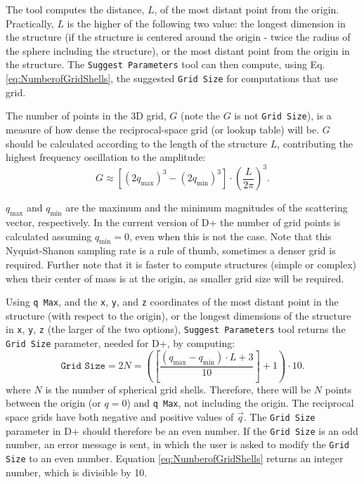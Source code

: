 \documentclass[../D+Manual.tex]{subfiles}
\begin{document}
The tool computes the distance, $L$, of the most distant point from the origin. 
\noindent Practically, $L$ is the higher of the following two value: the longest dimension in the structure (if the structure is centered around the origin - twice the radius of the sphere including the structure), or the most distant point from the origin in the structure. 
The \texttt{Suggest Parameters} tool can then compute, using Eq. \ref{eq:NumberofGridShells}, the suggested \texttt{Grid Size} for computations that use grid. 

The number of points in the 3D grid, $G$ (note the $G$ is not \texttt{Grid Size}), is a measure of how dense the reciprocal-space grid (or lookup table) will be. 
$G$ should be calculated according to the length of the structure $L$, contributing the highest frequency oscillation to the amplitude:
\begin{equation*}
G\approx \left[\left(2q_{\text{max}}\right)^3-\left(2q_{\text{min}}\right)^3\right]\cdot \left(\frac{L}{2\pi}\right)^3.
\label{eqn:GridDensity}
\end{equation*}

$q_\text{max}$ and $q_\text{min}$ are the maximum and the minimum magnitudes of the scattering vector, respectively. In the current version of D+ the number of grid points is calculated assuming  $q_\text{min}=0$, even when this is not the case. 
Note that this Nyquist-Shanon sampling rate is a rule of thumb, sometimes a denser grid is required. Further note that it is faster to compute structures (simple or complex) when their center of mass is at the origin, as smaller grid size will be required. 

Using \texttt{q Max}, 
and the \texttt{x}, \texttt{y}, and \texttt{z} coordinates of the most distant point in the structure (with respect to the origin), or the longest dimensions of the structure in \texttt{x}, \texttt{y}, \texttt{z} (the larger of the two options),  \texttt{Suggest Parameters} tool returns the \texttt{Grid Size} parameter, needed for D+, by computing:
\begin{equation}
\texttt{Grid Size} = 2N =  \left(\left[\frac{\left(q_{\text{max}}-q_{\text{min}}\right)\cdot L +3}{10}\right]+1\right)\cdot 10.
\label{eq:NumberofGridShells}
\end{equation}
where $N$ is the number of spherical grid shells. Therefore, there will be $N$ points between the origin (or $q=0$) and \texttt{q Max}, not including the origin. The reciprocal space grids have both negative and positive values of $\vec{q}$. The \texttt{Grid Size} parameter in D+ should therefore be an even number. If the \texttt{Grid Size} is an odd number, an error message is sent, in which the user is asked to modify the \texttt{Grid Size} to an even number.
Equation \ref{eq:NumberofGridShells} returns an integer number, which is divisible by 10.
\end{document}
